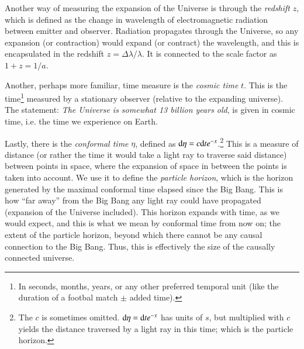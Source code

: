     Another way of measuring the expansion of the Universe is through the \textit{redshift} $z$, which is defined as the change in wavelength of electromagnetic radiation between emitter and observer. Radiation propagates through the Universe, so any expansion (or contraction) would expand (or contract) the wavelength, and this is encapsulated in the redshift $z=\Delta\lambda/\lambda$. It is connected to the scale factor as $1+z=1/a$.
    
    Another, perhaps more familiar, time measure is the \textit{cosmic time} $t$. This is the time\footnote{In seconds, months, years, or any other preferred temporal unit (like the duration of a footbal match $\pm$ added time).} measured by a stationary observer (relative to the expanding universe). The statement: \textit{The Universe is somewhat 13 billion years old}, is given in cosmic time, i.e. the time we experience on Earth. 

    Lastly, there is the \textit{conformal time} $\eta$, defined as $\mathrm{d}\eta = c\mathrm{d} te^{-x}$.\footnote{The $c$ is sometimes omitted. $\mathrm{d}\eta = \mathrm{d} te^{-x}$ has units of $\unit{s}$, but multiplied with $c$ yields the distance traversed by a light ray in this time; which is the particle horizon.} This is a measure of distance (or rather the time it would take a light ray to traverse said distance) between points in space, where the expansion of space in between the points is taken into account. We use it to define the \textit{particle horizon}, which is the horizon generated by the maximal conformal time elapsed since the Big Bang. This is how ``far away'' from the Big Bang any light ray could have propagated (expansion of the Universe included). This horizon expands with time, as we would expect, and this is what we mean by conformal time from now on; the extent of the particle horizon, beyond which there cannot be any causal connection to the Big Bang. Thus, this is effectively the size of the causally connected universe. 

